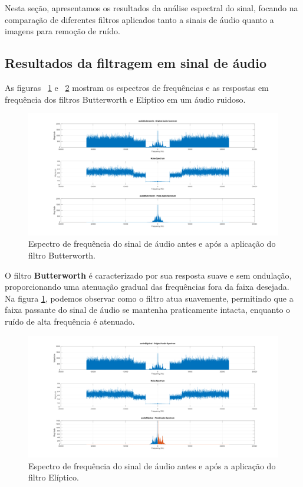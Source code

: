 Nesta seção, apresentamos os resultados da análise espectral do sinal, focando na comparação de diferentes filtros aplicados tanto a sinais de áudio quanto a imagens para remoção de ruído.

\subsection{Resultados da filtragem em sinal de áudio}
As figuras ~\ref{fig:audio_butterworth_spectrums} e ~\ref{fig:audio_elliptical_spectrums} mostram os espectros de frequências e as respostas em frequência dos filtros Butterworth e Elíptico em um áudio ruidoso.

\begin{figure}[H]
    \centering
    \includegraphics[width=1\linewidth]{03_results/assets/audio_butterworth_spectrums.png}
    \caption{Espectro de frequência do sinal de áudio antes e após a aplicação do filtro Butterworth.}
    \label{fig:audio_butterworth_spectrums}
\end{figure}

O filtro \textbf{Butterworth} é caracterizado por sua resposta suave e sem ondulação, proporcionando uma atenuação gradual das frequências fora da faixa desejada. Na figura \ref{fig:audio_butterworth_spectrums}, podemos observar como o filtro atua suavemente, permitindo que a faixa passante do sinal de áudio se mantenha praticamente intacta, enquanto o ruído de alta frequência é atenuado.

\begin{figure}[H]
    \centering
    \includegraphics[width=1\linewidth]{03_results/assets/audio_elliptical_spectrums.png}
    \caption{Espectro de frequência do sinal de áudio antes e após a aplicação do filtro Elíptico.}
    \label{fig:audio_elliptical_spectrums}
\end{figure}

